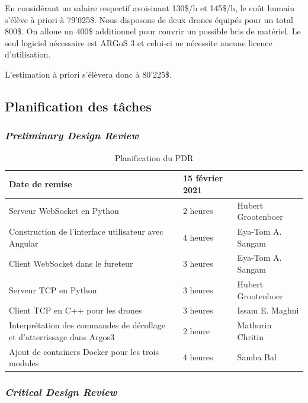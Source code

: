 \documentclass{mistcoursedoc}
\begin{document}
En considérant un salaire respectif avoisinant 130\$/h et 145\$/h, le coût humain s’élève à priori à 79'025\$.
Nous disposons de deux drones équipés pour un total 800\$.
On alloue un 400\$ additionnel pour couvrir un possible bris de matériel.
Le seul logiciel nécessaire est ARGoS 3 et celui-ci ne nécessite aucune licence d’utilisation.

L’estimation à priori s’élèvera donc à 80'225\$.

\newpage
\subsection{Planification des tâches}

\subsubsection{\emph{Preliminary Design Review}}
\begin{table}[h!]
  \centering
  \begin{tabular}{ M{7cm}M{3cm}M{3.5cm} }
    \hline
    Date de remise                                                          & 15 février 2021 & \tabularnewline\hline
    Serveur WebSocket en Python                                             & 2 heures        & Hubert Grootenboer\tabularnewline
    Construction de l’interface utilisateur avec Angular                    & 4 heures        & Eya-Tom A. Sangam \tabularnewline
    Client WebSocket dans le fureteur                                       & 3 heures        & Eya-Tom A. Sangam\tabularnewline
    Serveur TCP en Python                                                   & 3 heures        & Hubert Grootenboer\tabularnewline
    Client TCP en C++ pour les drones                                       & 3 heures        & Issam E. Maghni\tabularnewline
    Interprétation des commandes de décollage et d’atterrissage dans Argos3 & 2 heure         & Mathurin Chritin\tabularnewline
    Ajout de containers Docker pour les trois modules                       & 4 heures        & Samba Bal\tabularnewline
    \hline
  \end{tabular}
  \caption{Planification du PDR}
\end{table}

\subsubsection{\emph{Critical Design Review}}
\end{document}
